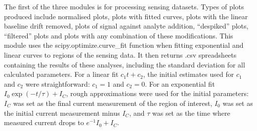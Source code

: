 \documentclass[
  a4paper,
]{scrbook}
\begin{document}
The first of the three modules is for processing sensing datasets. Types
of plots produced include normalised plots, plots with fitted curves,
plots with the linear baseline drift removed, plots of signal against
analyte addition, ``despiked'' plots, ``filtered'' plots and plots with
any combination of these modifications. This module uses the
scipy.optimize.curve\_fit function when fitting exponential and linear
curves to regions of the sensing data. It then returns .csv spreadsheets
containing the results of these analyses, including the standard
deviation for all calculated parameters. For a linear fit
\(c_1t + c_2\), the initial estimates used for \(c_1\) and \(c_2\) were
straightforward: \(c_1=1\) and \(c_2=0\). For an exponential fit
\(I_0\exp{(-t/\tau)} + I_C\), rough approximations were used for the
initial parameters: \(I_C\) was set as the final current measurement of
the region of interest, \(I_0\) was set as the initial current
measurement minus \(I_C\), and \(\tau\) was set as the time where
measured current drops to \(e^{-1}I_0 + I_C\).
\end{document}
